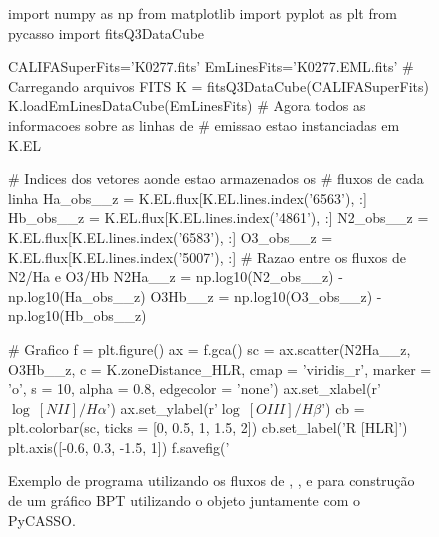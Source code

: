 \begin{figure}
	\begin{python}
import numpy as np
from matplotlib import pyplot as plt
from pycasso import fitsQ3DataCube

CALIFASuperFits='K0277.fits'
EmLinesFits='K0277.EML.fits'
# Carregando arquivos FITS
K = fitsQ3DataCube(CALIFASuperFits)
K.loadEmLinesDataCube(EmLinesFits)
# Agora todos as informacoes sobre as linhas de
# emissao estao instanciadas em K.EL

# Indices dos vetores aonde estao armazenados os
# fluxos de cada linha
Ha_obs__z = K.EL.flux[K.EL.lines.index('6563'), :]
Hb_obs__z = K.EL.flux[K.EL.lines.index('4861'), :]
N2_obs__z = K.EL.flux[K.EL.lines.index('6583'), :]
O3_obs__z = K.EL.flux[K.EL.lines.index('5007'), :]
# Razao entre os fluxos de N2/Ha e O3/Hb
N2Ha__z = np.log10(N2_obs__z) - np.log10(Ha_obs__z)
O3Hb__z = np.log10(O3_obs__z) - np.log10(Hb_obs__z)

# Grafico
f = plt.figure()
ax = f.gca()
sc = ax.scatter(N2Ha__z, O3Hb__z, c = K.zoneDistance_HLR,
           		cmap = 'viridis_r', marker = 'o', s = 10,
           		alpha = 0.8, edgecolor = 'none')
ax.set_xlabel(r'$\log\ [NII]/H\alpha$')
ax.set_ylabel(r'$\log\ [OIII]/H\beta$')
cb = plt.colorbar(sc, ticks = [0, 0.5, 1, 1.5, 2])
cb.set_label('R [HLR]')
plt.axis([-0.6, 0.3, -1.5, 1])
f.savefig('%
	\end{python}
	\caption[Exemplo de programa utilizando o EmLinesDataCube]
	{Exemplo de programa utilizando os fluxos de \Ha, \Hb, \OIII e \NII
para construção de um gráfico BPT utilizando o objeto \emldc juntamente com o PyCASSO.}
	\label{fig:BPTprog}
\end{figure}

